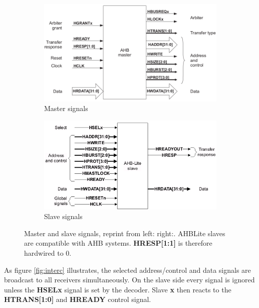 \begin{figure}[ht!]
 \centering
 \begin{subfigure}[b]{0.4\linewidth}
 \includegraphics[width=\linewidth]{figs/AHB/master_signals.png}
 \caption{Master signals}
 \end{subfigure}
 \begin{subfigure}[b]{0.4\linewidth}
 \includegraphics[width=\linewidth]{figs/AHB/slave_lite.png}
 \caption{Slave signals}
 \end{subfigure}
 \caption{Master and slave signals, reprint from left:\cite{amba} right:\cite{amba3}. AHBLite slaves are compatible with AHB systems\cite{ambacomp}. \textbf{HRESP[1:1]} is therefore hardwired to 0.}
 \label{fig:ahbsig}
\end{figure}


As figure \ref{fig:interc} illustrates, the selected address/control and data signals are broadcast to all receivers simultaneously. On the slave side every signal is ignored unless the \textbf{HSELx} signal is set by the decoder. Slave \textbf{x} then reacts to the \textbf{HTRANS[1:0]} and \textbf{HREADY} control signal. \\

